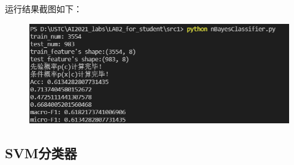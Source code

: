 \documentclass{ctexart}
\begin{document}
\par 运行结果截图如下：
\begin{figure}[htbp]
    \centering
    \includegraphics[scale=0.5]{nb.png}

\end{figure}
\subsection{\hei SVM分类器}
\end{document}

